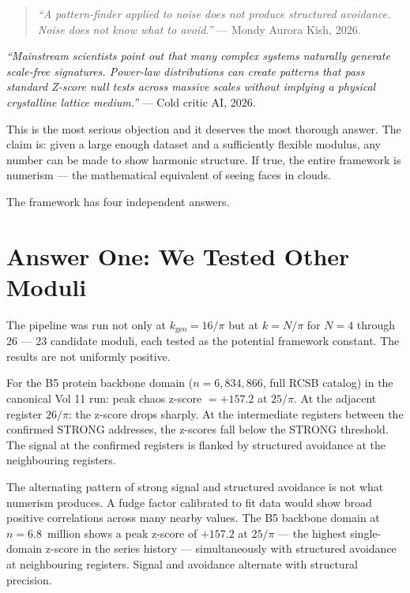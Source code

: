\documentclass[11pt, letterpaper, openany]{book}
\begin{document}
\begin{quote}
\textit{``A pattern-finder applied to noise does not produce
structured avoidance. Noise does not know what to avoid.''} ---
Mondy Aurora Kish, 2026.
\end{quote}

\begin{objectionbox}
\textit{``Mainstream scientists point out that many complex systems
naturally generate scale-free signatures. Power-law distributions
can create patterns that pass standard Z-score null tests across
massive scales without implying a physical crystalline lattice
medium.''} --- Cold critic AI, 2026.
\end{objectionbox}

This is the most serious objection and it deserves the most thorough
answer. The claim is: given a large enough dataset and a sufficiently
flexible modulus, any number can be made to show harmonic structure.
If true, the entire framework is numerism --- the mathematical equivalent
of seeing faces in clouds.

The framework has four independent answers.

\section{Answer One: We Tested Other Moduli}

The pipeline was run not only at $k_\text{geo} = 16/\pi$ but at
$k = N/\pi$ for $N = 4$ through $26$ --- 23 candidate moduli, each
tested as the potential framework constant. The results are not
uniformly positive.

For the B5 protein backbone domain ($n = 6{,}834{,}866$, full RCSB
catalog) in the canonical Vol 11 run: peak chaos z-score $= +157.2$
at $25/\pi$. At the adjacent register $26/\pi$: the z-score drops
sharply. At the intermediate registers between the confirmed STRONG
addresses, the z-scores fall below the STRONG threshold. The signal
at the confirmed registers is flanked by structured avoidance at the
neighbouring registers.
 
The alternating pattern of strong signal and structured avoidance
is not what numerism produces. A fudge factor calibrated to fit data
would show broad positive correlations across many nearby values.
The B5 backbone domain at $n = 6.8$~million shows a peak z-score of
$+157.2$ at $25/\pi$ --- the highest single-domain z-score in the
series history --- simultaneously with structured avoidance at
neighbouring registers. Signal and avoidance alternate with
structural precision.
 
\end{document}

